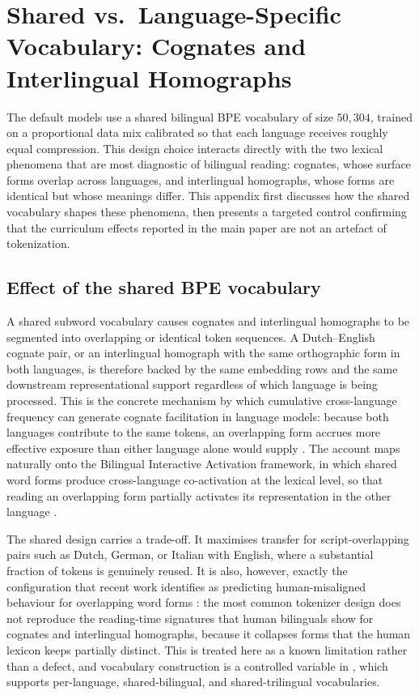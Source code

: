
\section{Shared vs.\ Language-Specific Vocabulary: Cognates and Interlingual Homographs}\label{app:tokenizer-cognate}

The default \beetle{} models use a shared bilingual BPE vocabulary of size $50{,}304$, trained on a proportional data mix calibrated so that each language receives roughly equal compression. This design choice interacts directly with the two lexical phenomena that are most diagnostic of bilingual reading: cognates, whose surface forms overlap across languages, and interlingual homographs, whose forms are identical but whose meanings differ. This appendix first discusses how the shared vocabulary shapes these phenomena, then presents a targeted control confirming that the curriculum effects reported in the main paper are not an artefact of tokenization.

\subsection{Effect of the shared BPE vocabulary}

A shared subword vocabulary causes cognates and interlingual homographs to be segmented into overlapping or identical token sequences. A Dutch--English cognate pair, or an interlingual homograph with the same orthographic form in both languages, is therefore backed by the same embedding rows and the same downstream representational support regardless of which language is being processed. This is the concrete mechanism by which cumulative cross-language frequency can generate cognate facilitation in language models: because both languages contribute to the same tokens, an overlapping form accrues more effective exposure than either language alone would supply \citep{winther2021cumulative}. The account maps naturally onto the Bilingual Interactive Activation framework, in which shared word forms produce cross-language co-activation at the lexical level, so that reading an overlapping form partially activates its representation in the other language \citep{dijkstra2002architecture,dijkstra2000interlingual}.

The shared design carries a trade-off. It maximises transfer for script-overlapping pairs such as Dutch, German, or Italian with English, where a substantial fraction of tokens is genuinely reused. It is also, however, exactly the configuration that recent work identifies as predicting human-misaligned behaviour for overlapping word forms \citep{skrjanec2026crosslingual}: the most common tokenizer design does not reproduce the reading-time signatures that human bilinguals show for cognates and interlingual homographs, because it collapses forms that the human lexicon keeps partially distinct. This is treated here as a known limitation rather than a defect, and vocabulary construction is a controlled variable in \beetle{}, which supports per-language, shared-bilingual, and shared-trilingual vocabularies.

